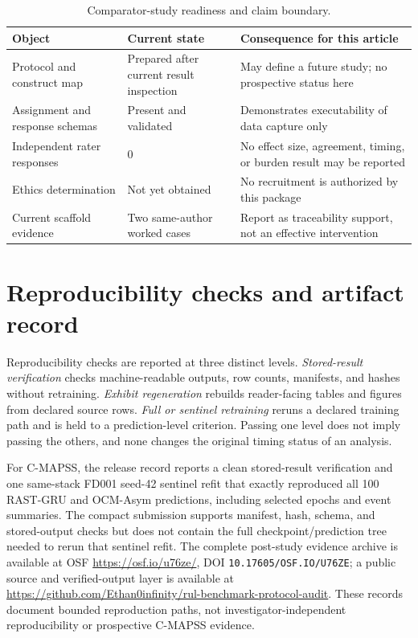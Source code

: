 \documentclass[11pt,a4paper]{article}
\begin{document}
\begin{table}[H]
\centering
\small
\caption{Comparator-study readiness and claim boundary.}
\label{tab:comparator-status}
\begin{tabular}{@{}p{}p{}p{}@{}}
\toprule
Object & Current state & Consequence for this article \\
\midrule
Protocol and construct map & Prepared after current result inspection & May define a future study; no prospective status here \\
Assignment and response schemas & Present and validated & Demonstrates executability of data capture only \\
Independent rater responses & 0 & No effect size, agreement, timing, or burden result may be reported \\
Ethics determination & Not yet obtained & No recruitment is authorized by this package \\
Current scaffold evidence & Two same-author worked cases & Report as traceability support, not an effective intervention \\
\bottomrule
\end{tabular}
\end{table}

\section{Reproducibility checks and artifact record}

Reproducibility checks are reported at three distinct levels. \emph{Stored-result verification} checks machine-readable outputs, row counts, manifests, and hashes without retraining. \emph{Exhibit regeneration} rebuilds reader-facing tables and figures from declared source rows. \emph{Full or sentinel retraining} reruns a declared training path and is held to a prediction-level criterion. Passing one level does not imply passing the others, and none changes the original timing status of an analysis.

For C-MAPSS, the release record reports a clean stored-result verification and one same-stack FD001 seed-42 sentinel refit that exactly reproduced all 100 RAST-GRU and OCM-Asym predictions, including selected epochs and event summaries. The compact submission supports manifest, hash, schema, and stored-output checks but does not contain the full checkpoint/prediction tree needed to rerun that sentinel refit. The complete post-study evidence archive is available at OSF \url{https://osf.io/u76ze/}, DOI \nolinkurl{10.17605/OSF.IO/U76ZE}; a public source and verified-output layer is available at \url{https://github.com/Ethan0infinity/rul-benchmark-protocol-audit}. These records document bounded reproduction paths, not investigator-independent reproducibility or prospective C-MAPSS evidence.
\end{document}

